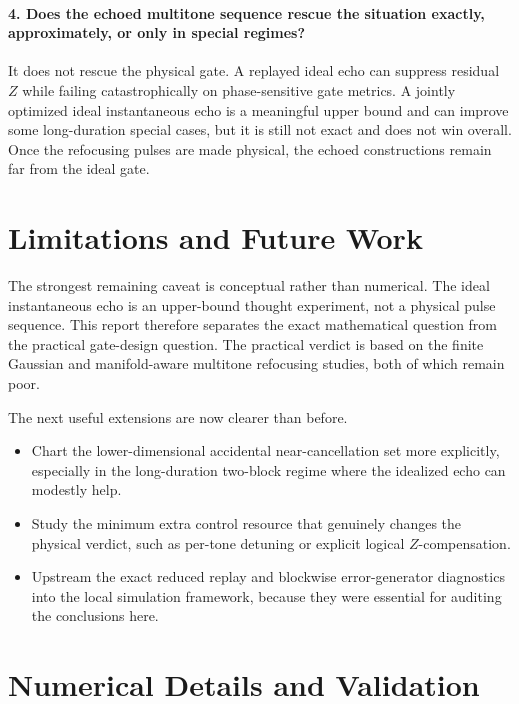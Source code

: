 \documentclass[aps,pra,twocolumn,reprint,floatfix,amsmath,amssymb]{revtex4-2}
\begin{document}
\paragraph*{4. Does the echoed multitone sequence rescue the situation exactly, approximately, or only in special regimes?}
It does not rescue the physical gate. A replayed ideal echo can suppress residual \(Z\) while failing catastrophically on phase-sensitive gate metrics. A jointly optimized ideal instantaneous echo is a meaningful upper bound and can improve some long-duration special cases, but it is still not exact and does not win overall. Once the refocusing pulses are made physical, the echoed constructions remain far from the ideal gate.

\section{Limitations and Future Work}
\label{sec:limitations}

The strongest remaining caveat is conceptual rather than numerical. The ideal instantaneous echo is an upper-bound thought experiment, not a physical pulse sequence. This report therefore separates the exact mathematical question from the practical gate-design question. The practical verdict is based on the finite Gaussian and manifold-aware multitone refocusing studies, both of which remain poor.

The next useful extensions are now clearer than before.
\begin{itemize}
  \item Chart the lower-dimensional accidental near-cancellation set more explicitly, especially in the long-duration two-block regime where the idealized echo can modestly help.
  \item Study the minimum extra control resource that genuinely changes the physical verdict, such as per-tone detuning or explicit logical \(Z\)-compensation.
  \item Upstream the exact reduced replay and blockwise error-generator diagnostics into the local simulation framework, because they were essential for auditing the conclusions here.
\end{itemize}

\appendix

\section{Numerical Details and Validation}
\label{app:validation}
\end{document}
